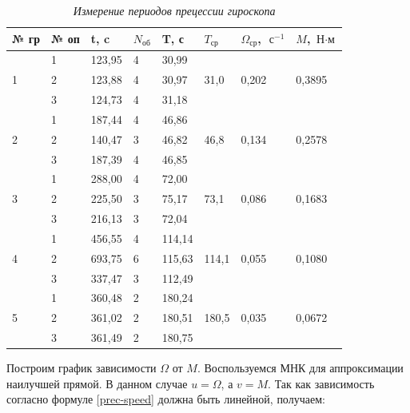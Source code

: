 \documentclass[a4paper,12pt]{article}
\begin{document}
\begin{table}[!ht]
    \centering
    \begin{tabular}{|l|l|l|l|l|l|l|l|}
    \hline
        № гр & № оп & t, c & $N_\text{об}$ & T, с & $T_\text{ср}$ & $\Omega_\text{ср}$, $\text{ с}^{-1}$ & $M$, $\text{Н} \cdot \text{м}$ \\ \hline
        \multirow{3}{*}{1} & 1 & 123,95 & 4 & 30,99 & \multirow{3}{*}{31,0} & \multirow{3}{*}{0,202} & \multirow{3}{*}{0,3895} \\ \cline{2-5}
        ~ & 2 & 123,88 & 4 & 30,97 & ~ & ~ & ~ \\ \cline{2-5}
        ~ & 3 & 124,73 & 4 & 31,18 & ~ & ~ & ~ \\ \hline
        \multirow{3}{*}{2} & 1 & 187,44 & 4 & 46,86 & \multirow{3}{*}{46,8} & \multirow{3}{*}{0,134} & \multirow{3}{*}{0,2578} \\ \cline{2-5}
        ~ & 2 & 140,47 & 3 & 46,82 & ~ & ~ & ~ \\ \cline{2-5}
        ~ & 3 & 187,39 & 4 & 46,85 & ~ & ~ & ~ \\ \hline
        \multirow{3}{*}{3} & 1 & 288,00 & 4 & 72,00 & \multirow{3}{*}{73,1} & \multirow{3}{*}{0,086} & \multirow{3}{*}{0,1683} \\ \cline{2-5}
        ~ & 2 & 225,50 & 3 & 75,17 & ~ & ~ & ~ \\ \cline{2-5}
        ~ & 3 & 216,13 & 3 & 72,04 & ~ & ~ & ~ \\ \hline
        \multirow{3}{*}{4} & 1 & 456,55 & 4 & 114,14 & \multirow{3}{*}{114,1} & \multirow{3}{*}{0,055} & \multirow{3}{*}{0,1080} \\ \cline{2-5}
        ~ & 2 & 693,75 & 6 & 115,63 & ~ & ~ & ~ \\ \cline{2-5}
        ~ & 3 & 337,47 & 3 & 112,49 & ~ & ~ & ~ \\ \hline
        \multirow{3}{*}{5} & 1 & 360,48 & 2 & 180,24 & \multirow{3}{*}{180,5} & \multirow{3}{*}{0,035} & \multirow{3}{*}{0,0672} \\ \cline{2-5}
        ~ & 2 & 361,02 & 2 & 180,51 & ~ & ~ & ~ \\ \cline{2-5}
        ~ & 3 & 361,49 & 2 & 180,75 & ~ & ~ & ~ \\ \hline
    \end{tabular}\caption{\textit{Измерение периодов прецессии гироскопа}}\label{precession}
\end{table}

Построим график зависимости $\Omega$ от $M$. Воспользуемся МНК для аппроксимации наилучшей прямой. В данном случае $u = \Omega$, а $v = M$. Так как зависимость согласно формуле \eqref{prec-speed} должна быть линейной, получаем:
\end{document}
